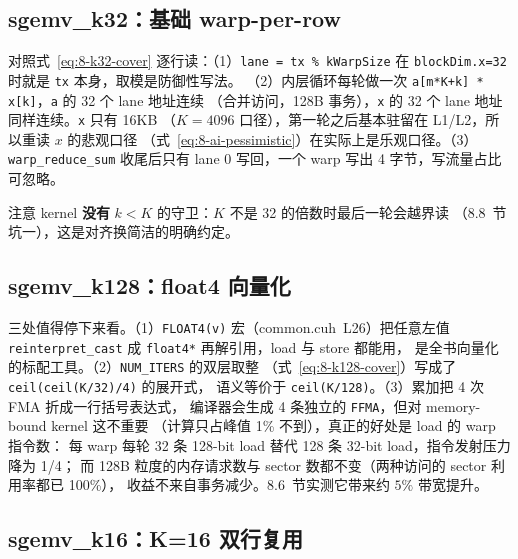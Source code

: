 \subsection{sgemv\_k32：基础 warp-per-row}



对照式~\ref{eq:8-k32-cover} 逐行读：（1）\texttt{lane = tx \% kWarpSize} 在
\texttt{block\allowbreak{}Dim.\allowbreak{}x=\allowbreak{}32} 时就是 \texttt{tx} 本身，取模是防御性写法。
（2）内层循环每轮做一次 \texttt{a[m*K+k] * x[k]}，\texttt{a} 的 32 个 lane 地址连续
（合并访问，128B 事务），\texttt{x} 的 32 个 lane 地址同样连续。\texttt{x} 只有 16KB
（$K=4096$ 口径），第一轮之后基本驻留在 L1/L2，所以重读 $x$ 的悲观口径
（式~\ref{eq:8-ai-pessimistic}）在实际上是乐观口径。（3）\texttt{warp\_\allowbreak{}reduce\_\allowbreak{}sum}
收尾后只有 lane 0 写回，一个 warp 写出 4 字节，写流量占比可忽略。

注意 kernel \textbf{没有} $k < K$ 的守卫：$K$ 不是 32 的倍数时最后一轮会越界读
（8.8~节坑一），这是对齐换简洁的明确约定。

\subsection{sgemv\_k128：float4 向量化}



三处值得停下来看。（1）\texttt{FLOAT4(v)} 宏（common.cuh~L26）把任意左值
\texttt{reinterpret\_\allowbreak{}cast} 成 \texttt{float4*} 再解引用，load 与 store 都能用，
是全书向量化的标配工具。（2）\texttt{NUM\_ITERS} 的双层取整
（式~\ref{eq:8-k128-cover}）写成了 \texttt{ceil\allowbreak{}(ceil\allowbreak{}(K/\allowbreak{}32)/\allowbreak{}4)} 的展开式，
语义等价于 \texttt{ceil(K/128)}。（3）累加把 4 次 FMA 折成一行括号表达式，
编译器会生成 4 条独立的 \texttt{FFMA}，但对 memory-bound kernel 这不重要
（计算只占峰值 1\% 不到），真正的好处是 load 的 warp 指令数：
每 warp 每轮 32 条 128-bit load 替代 128 条 32-bit load，指令发射压力降为 1/4；
而 128B 粒度的内存请求数与 sector 数都不变（两种访问的 sector 利用率都已 100\%），
收益不来自事务减少。8.6~节实测它带来约 $5\%$ 带宽提升。

\subsection{sgemv\_k16：K=16 双行复用}

